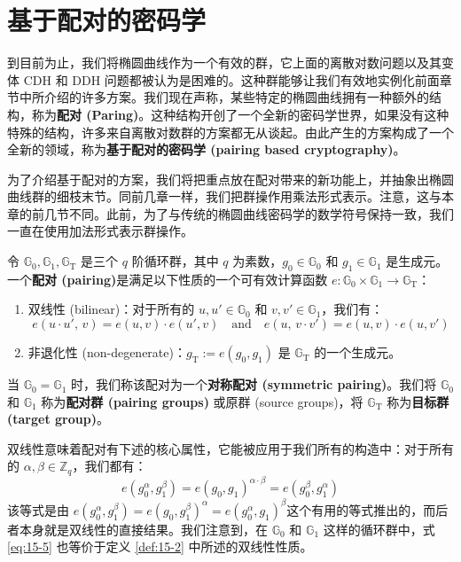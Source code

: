 \section{基于配对的密码学}\label{sec:15-4}

到目前为止，我们将椭圆曲线作为一个有效的群，它上面的离散对数问题以及其变体 CDH 和 DDH 问题都被认为是困难的。这种群能够让我们有效地实例化前面章节中所介绍的许多方案。我们现在声称，某些特定的椭圆曲线拥有一种额外的结构，称为\textbf{配对 (Paring)}。这种结构开创了一个全新的密码学世界，如果没有这种特殊的结构，许多来自离散对数群的方案都无从谈起。由此产生的方案构成了一个全新的领域，称为\textbf{基于配对的密码学 (pairing based cryptography)}。

为了介绍基于配对的方案，我们将把重点放在配对带来的新功能上，并抽象出椭圆曲线群的细枝末节。同前几章一样，我们把群操作用乘法形式表示。注意，这与本章的前几节不同。此前，为了与传统的椭圆曲线密码学的数学符号保持一致，我们一直在使用加法形式表示群操作。

\begin{definition}\label{def:15-2}
令 $\mathbb{G}_0,\mathbb{G}_1,\mathbb{G}_\mathrm{T}$ 是三个 $q$ 阶循环群，其中 $q$ 为素数，$g_0\in\mathbb{G}_0$ 和 $g_1\in\mathbb{G}_1$ 是生成元。一个\textbf{配对 (pairing)}是满足以下性质的一个可有效计算函数 $e:\mathbb{G}_0\times\mathbb{G}_1\to\mathbb{G}_\mathrm{T}$：
\begin{enumerate}
	\item 双线性 (bilinear)：对于所有的 $u,u'\in\mathbb{G}_0$ 和 $v,v'\in\mathbb{G}_1$，我们有：
	\[
		e(u\cdot u',\,v)=e(u,v)\cdot e(u',v)
		\quad\text{and}\quad
		e(u,\,v\cdot v')=e(u,v)\cdot e(u,v')
	\]
	\item 非退化性 (non-degenerate)：$g_\mathrm{T}:=e(g_0,g_1)$ 是 $\mathbb{G}_\mathrm{T}$ 的一个生成元。
\end{enumerate}
当 $\mathbb{G}_0=\mathbb{G}_1$ 时，我们称该配对为一个\textbf{对称配对 (symmetric pairing)}。我们将 $\mathbb{G}_0$ 和 $\mathbb{G}_1$ 称为\textbf{配对群 (pairing groups)} 或原群 (source groups)，将 $\mathbb{G}_\mathrm{T}$ 称为\textbf{目标群 (target group)}。
\end{definition}

双线性意味着配对有下述的核心属性，它能被应用于我们所有的构造中：对于所有的 $\alpha,\beta\in\mathbb{Z}_q$，我们都有：
\begin{equation}\label{eq:15-5}
e(g_0^\alpha,g_1^\beta)=e(g_0,g_1)^{\alpha\cdot\beta}=e(g_0^\beta,g_1^\alpha)
\end{equation}
该等式是由 $e(g_0^\alpha,g_1^\beta)=e(g_0,g_1^\beta)^{\alpha}=e(g_0^\alpha,g_1)^\beta$这个有用的等式推出的，而后者本身就是双线性的直接结果。我们注意到，在 $\mathbb{G}_0$ 和 $\mathbb{G}_1$ 这样的循环群中，式 \ref{eq:15-5} 也等价于定义 \ref{def:15-2} 中所述的双线性性质。

